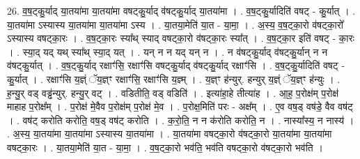 \documentclass[17pt]{extarticle}
\begin{document}
26. व॒ष॒ट्कु॒र्याद् या॒तया॑मा या॒तया॑मा वषट्कु॒र्याद् व॑षट्कु॒र्याद् या॒तया॑मा । . व॒ष॒ट्कु॒र्यादिति॑ वषट् - कु॒र्यात् । . या॒तया॑मा ऽस्यास्य या॒तया॑मा या॒तया॑मा ऽस्य । . या॒तया॒मेति॑ या॒त - या॒मा॒ । . अ॒स्य॒ व॒ष॒ट्का॒रो व॑षट्का॒रो᳚ ऽस्यास्य वषट्का॒रः । . व॒ष॒ट्का॒रः स्या᳚थ् स्याद् वषट्का॒रो व॑षट्का॒रः स्या᳚त् । . व॒ष॒ट्का॒र इति॑ वषट् - का॒रः । . स्या॒द् यद् यथ् स्या᳚थ् स्या॒द् यत् । . यन् न न यद् यन् न । . न व॑षट्कु॒र्याद् व॑षट्कु॒र्यान् न न व॑षट्कु॒र्यात् । . व॒ष॒ट्कु॒र्याद् रक्षाꣳ॑सि॒ रक्षाꣳ॑सि वषट्कु॒र्याद् व॑षट्कु॒र्याद् रक्षाꣳ॑सि । . व॒ष॒ट्कु॒र्यादिति॑ वषट् - कु॒र्यात् । . रक्षाꣳ॑सि य॒ज्ञ्ं ॅय॒ज्ञ्ꣳ रक्षाꣳ॑सि॒ रक्षाꣳ॑सि य॒ज्ञ्म् । . य॒ज्ञ्ꣳ ह॑न्युर्. हन्युर् य॒ज्ञ्ं ॅय॒ज्ञ्ꣳ ह॑न्युः । . ह॒न्यु॒र् वड् वड्ढ॑न्युर्. हन्यु॒र् वट् । . वडितीति॒ वड् वडिति॑ । . इत्या॑हा॒हे तीत्या॑ह । . आ॒ह॒ प॒रोक्ष॑म् प॒रोक्ष॑ माहाह प॒रोक्ष᳚म् । . प॒रोक्ष॑ मे॒वैव प॒रोक्ष॑म् प॒रोक्ष॑ मे॒व । . प॒रोक्ष॒मिति॑ परः - अक्ष᳚म् । . ए॒व वष॒ड् वष॑डे॒ वैव वष॑ट् । . वष॑ट् करोति करोति॒ वष॒ड् वष॑ट् करोति । . क॒रो॒ति॒ न न क॑रोति करोति॒ न । . नास्या᳚स्य॒ न नास्य॑ । . अ॒स्य॒ या॒तया॑मा या॒तया॑मा ऽस्यास्य या॒तया॑मा । . या॒तया॑मा वषट्का॒रो व॑षट्का॒रो या॒तया॑मा या॒तया॑मा वषट्का॒रः । . या॒तया॒मेति॑ या॒त - या॒मा॒ । . व॒ष॒ट्का॒रो भव॑ति॒ भव॑ति वषट्का॒रो व॑षट्का॒रो भव॑ति । \newline
\end{document}

